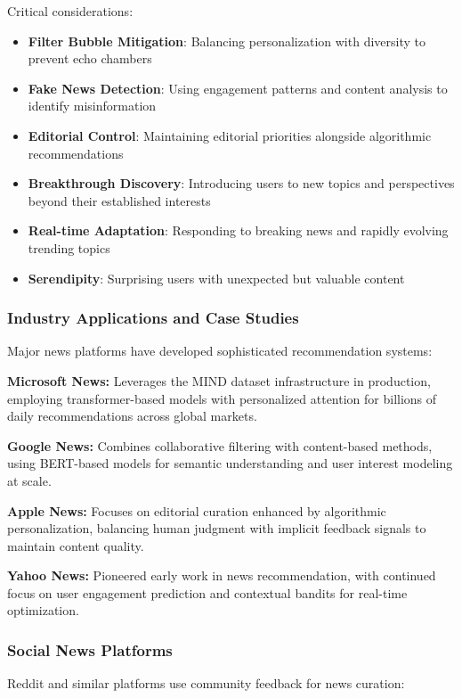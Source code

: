 Critical considerations:
\begin{itemize}
    \item \textbf{Filter Bubble Mitigation}: Balancing personalization with diversity to prevent echo chambers
    \item \textbf{Fake News Detection}: Using engagement patterns and content analysis to identify misinformation
    \item \textbf{Editorial Control}: Maintaining editorial priorities alongside algorithmic recommendations
    \item \textbf{Breakthrough Discovery}: Introducing users to new topics and perspectives beyond their established interests
    \item \textbf{Real-time Adaptation}: Responding to breaking news and rapidly evolving trending topics
    \item \textbf{Serendipity}: Surprising users with unexpected but valuable content
\end{itemize}

\subsubsection{Industry Applications and Case Studies}

Major news platforms have developed sophisticated recommendation systems:

\textbf{Microsoft News:} Leverages the MIND dataset infrastructure in production, employing transformer-based models with personalized attention for billions of daily recommendations across global markets.

\textbf{Google News:} Combines collaborative filtering with content-based methods, using BERT-based models for semantic understanding and user interest modeling at scale.

\textbf{Apple News:} Focuses on editorial curation enhanced by algorithmic personalization, balancing human judgment with implicit feedback signals to maintain content quality.

\textbf{Yahoo News:} Pioneered early work in news recommendation, with continued focus on user engagement prediction and contextual bandits for real-time optimization.

\subsubsection{Social News Platforms}

Reddit and similar platforms use community feedback for news curation:

